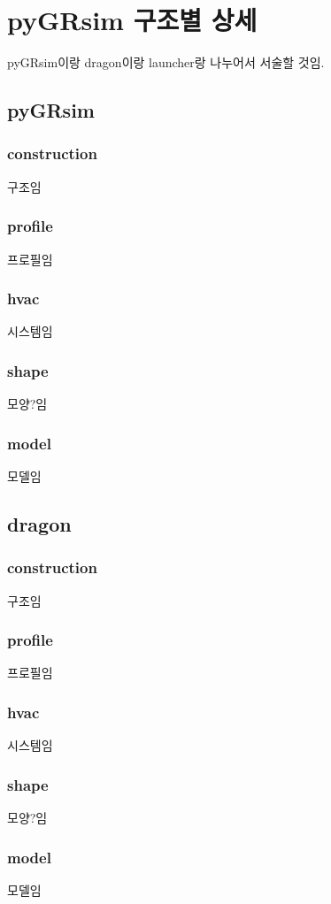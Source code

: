 \section{pyGRsim 구조별 상세}
pyGRsim이랑 dragon이랑 launcher랑 나누어서 서술할 것임.

\subsection{pyGRsim}
\subsubsection{construction}
구조임
\subsubsection{profile}
프로필임
\subsubsection{hvac}
시스템임
\subsubsection{shape}
모양?임
\subsubsection{model}
모델임

\subsection{dragon}
\subsubsection{construction}
구조임
\subsubsection{profile}
프로필임
\subsubsection{hvac}
시스템임
\subsubsection{shape}
모양?임
\subsubsection{model}
모델임
